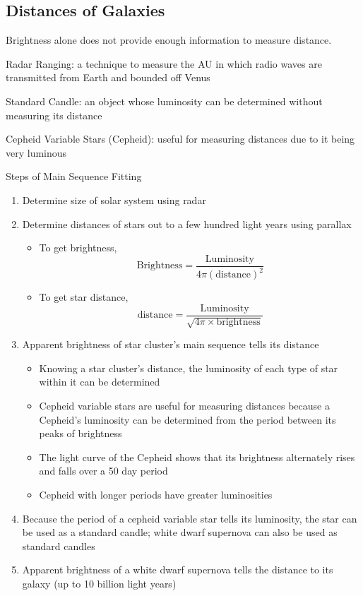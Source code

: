\documentclass[12pt]{article}
\begin{document}
\subsection{Distances of Galaxies} 
Brightness alone does not provide enough information to measure distance. 
\begin{definition} Radar Ranging: a technique to measure the AU in which radio waves are transmitted from Earth and bounded off Venus \end{definition} 
\begin{definition} Standard Candle: an object whose luminosity can be determined without measuring its distance \end{definition} 
\begin{definition} Cepheid Variable Stars (Cepheid): useful for measuring distances due to it being very luminous \end{definition} 
Steps of Main Sequence Fitting \begin{enumerate} 
\item Determine size of solar system using radar 
\item Determine distances of stars out to a few hundred light years using parallax \begin{itemize}
\item To get brightness, $$\text{Brightness} = \frac{\text{Luminosity}}{4\pi(\text{distance})^2} $$ 
\item To get star distance, $$\text{distance} = \frac{\text{Luminosity}}{\sqrt{4\pi \times \text{brightness}}} $$ \end{itemize} \newpage
\item Apparent brightness of star cluster's main sequence tells its distance \begin{itemize}
\item Knowing a star cluster's distance, the luminosity of each type of star within it can be determined 
\item Cepheid variable stars are useful for measuring distances because a Cepheid's luminosity can be determined from the period between its peaks of brightness
\item The light curve of the Cepheid shows that its brightness alternately rises and falls over a 50 day period
\item Cepheid with longer periods have greater luminosities \end{itemize}
\item Because the period of a cepheid variable star tells its luminosity, the star can be used as a standard candle; white dwarf supernova can also be used as standard candles 
\item Apparent brightness of a white dwarf supernova tells the distance to its galaxy (up to 10 billion light years) \end{enumerate} 
\end{document}
